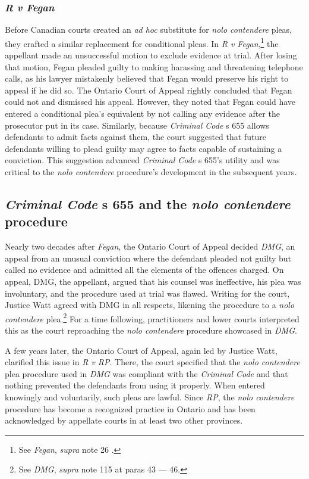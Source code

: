 \subsubsection{\textit{R v Fegan}}

Before Canadian courts created an \textit{ad hoc} substitute for \textit{nolo contendere} pleas, they crafted a similar replacement for conditional pleas. In \textit{R v Fegan},\footnote{See \textit{Fegan}, \textit{supra} note 26   .} the appellant made an unsuccessful motion to exclude evidence at trial. After losing that motion, Fegan pleaded guilty to making harassing and threatening telephone calls, as his lawyer mistakenly believed that Fegan would preserve his right to appeal if he did so. The Ontario Court of Appeal rightly concluded that Fegan could not and dismissed his appeal. However, they noted that Fegan could have entered a conditional plea's equivalent by not calling any evidence after the prosecutor put in its case. Similarly, because \textit{Criminal Code} s 655 allows defendants to admit facts against them, the court suggested that future defendants willing to plead guilty may agree to facts capable of sustaining a conviction. This suggestion advanced \textit{Criminal Code} s 655's utility and was critical to the \textit{nolo contendere} procedure's development in the subsequent years.

\subsection{\textit{Criminal Code} s 655 and the \textit{nolo contendere} procedure}

Nearly two decades after \textit{Fegan}, the Ontario Court of Appeal decided \textit{DMG}, an appeal from an unusual conviction where the defendant pleaded not guilty but called no evidence and admitted all the elements of the offences charged. On appeal, DMG, the appellant, argued that his counsel was ineffective, his plea was involuntary, and the procedure used at trial was flawed. Writing for the court, Justice Watt agreed with DMG in all respects, likening the procedure to a \textit{nolo contendere} plea.\footnote{See \textit{DMG}, \textit{supra} note 115 at paras 43 — 46.} For a time following, practitioners and lower courts interpreted this as the court reproaching the \textit{nolo contendere} procedure showcased in \textit{DMG}.

A few years later, the Ontario Court of Appeal, again led by Justice Watt, clarified this issue in \textit{R v RP}. There, the court specified that the \textit{nolo contendere} plea procedure used in \textit{DMG} was compliant with the \textit{Criminal Code} and that nothing prevented the defendants from using it properly. When entered knowingly and voluntarily, such pleas are lawful. Since \textit{RP}, the \textit{nolo contendere} procedure has become a recognized practice in Ontario and has been acknowledged by appellate courts in at least two other provinces.

